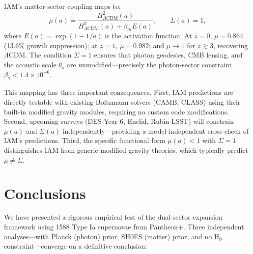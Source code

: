 \documentclass[twocolumn,superscriptaddress,prd,amsmath,amssymb]{revtex4-2}
\begin{document}
IAM's matter-sector coupling maps to:
\begin{equation}
\mu(a) = \frac{H^2_{\Lambda\text{CDM}}(a)}{H^2_{\Lambda\text{CDM}}(a) + \beta_m E(a)}, \qquad \Sigma(a) = 1,
\end{equation}
where $E(a) = \exp(1 - 1/a)$ is the activation function. At $z = 0$, $\mu = 0.864$ (13.6\% growth suppression); at $z = 1$, $\mu = 0.982$; and $\mu \to 1$ for $z \gtrsim 3$, recovering $\Lambda$CDM. The condition $\Sigma = 1$ ensures that photon geodesics, CMB lensing, and the acoustic scale $\theta_s$ are unmodified---precisely the photon-sector constraint $\beta_\gamma < 1.4 \times 10^{-6}$.

This mapping has three important consequences. First, IAM predictions are directly testable with existing Boltzmann solvers (CAMB, CLASS) using their built-in modified gravity modules, requiring no custom code modifications. Second, upcoming surveys (DES Year 6, Euclid, Rubin-LSST) will constrain $\mu(a)$ and $\Sigma(a)$ independently---providing a model-independent cross-check of IAM's predictions. Third, the specific functional form $\mu(a) < 1$ with $\Sigma = 1$ distinguishes IAM from generic modified gravity theories, which typically predict $\mu \neq \Sigma$.

\section{Conclusions}

We have presented a rigorous empirical test of the dual-sector expansion framework using 1588 Type Ia supernovae from Pantheon+. Three independent analyses---with Planck (photon) prior, SH0ES (matter) prior, and no H$_0$ constraint---converge on a definitive conclusion:
\end{document}
